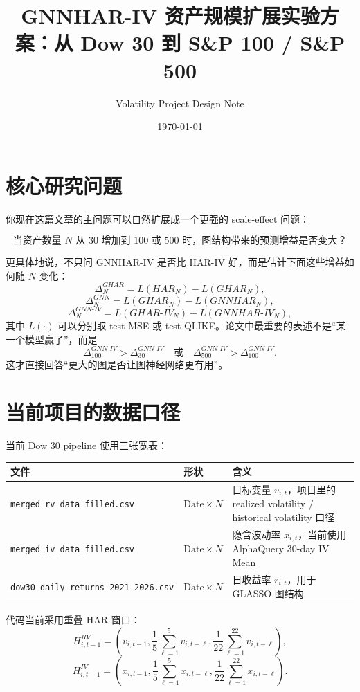 \documentclass[11pt,a4paper]{ctexart}
\title{GNNHAR-IV 资产规模扩展实验方案：从 Dow 30 到 S\&P 100 / S\&P 500}
\author{Volatility Project Design Note}
\date{\today}
\begin{document}
\maketitle

\section{核心研究问题}

你现在这篇文章的主问题可以自然扩展成一个更强的 scale-effect 问题：

\[
\text{当资产数量 } N \text{ 从 }30\text{ 增加到 }100\text{ 或 }500\text{ 时，图结构带来的预测增益是否变大？}
\]

更具体地说，不只问 GNNHAR-IV 是否比 HAR-IV 好，而是估计下面这些增益如何随 \(N\) 变化：
\[
\Delta^{GHAR}_{N}
= L(HAR_N)-L(GHAR_N),
\]
\[
\Delta^{GNN}_{N}
= L(GHAR_N)-L(GNNHAR_N),
\]
\[
\Delta^{GNN\text{-}IV}_{N}
= L(GHAR\text{-}IV_N)-L(GNNHAR\text{-}IV_N),
\]
其中 \(L(\cdot)\) 可以分别取 test MSE 或 test QLIKE。论文中最重要的表述不是“某一个模型赢了”，而是
\[
\Delta^{GNN\text{-}IV}_{100} > \Delta^{GNN\text{-}IV}_{30}
\quad\text{或}\quad
\Delta^{GNN\text{-}IV}_{500} > \Delta^{GNN\text{-}IV}_{100}.
\]
这才直接回答“更大的图是否让图神经网络更有用”。

\section{当前项目的数据口径}

当前 Dow 30 pipeline 使用三张宽表：

\begin{longtable}{lll}
\toprule
文件 & 形状 & 含义 \\
\midrule
\endhead
\texttt{merged\_rv\_data\_filled.csv} & \(\text{Date}\times N\) & 目标变量 \(v_{i,t}\)，项目里的 realized volatility / historical volatility 口径 \\
\texttt{merged\_iv\_data\_filled.csv} & \(\text{Date}\times N\) & 隐含波动率 \(x_{i,t}\)，当前使用 AlphaQuery 30-day IV Mean \\
\texttt{dow30\_daily\_returns\_2021\_2026.csv} & \(\text{Date}\times N\) & 日收益率 \(r_{i,t}\)，用于 GLASSO 图结构 \\
\bottomrule
\end{longtable}

代码当前采用重叠 HAR 窗口：
\[
H^{RV}_{i,t-1}
=
\left(
v_{i,t-1},
\frac{1}{5}\sum_{\ell=1}^{5} v_{i,t-\ell},
\frac{1}{22}\sum_{\ell=1}^{22} v_{i,t-\ell}
\right),
\]
\[
H^{IV}_{i,t-1}
=
\left(
x_{i,t-1},
\frac{1}{5}\sum_{\ell=1}^{5} x_{i,t-\ell},
\frac{1}{22}\sum_{\ell=1}^{22} x_{i,t-\ell}
\right).
\]
\end{document}
